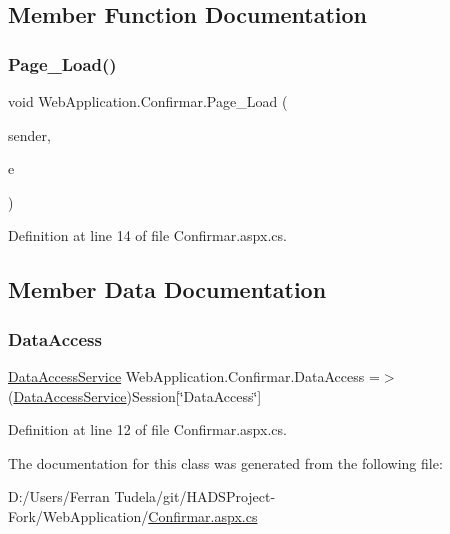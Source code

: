 \subsection{Member Function Documentation}
\mbox{\label{classWebApplication_1_1Confirmar_a0ba1fd0d9bb4844635cf79b6762cb42b}} 
\subsubsection{\texorpdfstring{Page\_Load()}{Page\_Load()}}
{\footnotesize\ttfamily void Web\+Application.\+Confirmar.\+Page\+\_\+\+Load (\begin{DoxyParamCaption}\item[{object}]{sender,  }\item[{Event\+Args}]{e }\end{DoxyParamCaption})\hspace{0.3cm}{\ttfamily [protected]}}



Definition at line 14 of file Confirmar.\+aspx.\+cs.



\subsection{Member Data Documentation}
\mbox{\label{classWebApplication_1_1Confirmar_ac2223a11ebcaa342108a44f9c8277855}} 
\subsubsection{\texorpdfstring{DataAccess}{DataAccess}}
{\footnotesize\ttfamily \mbox{\hyperlink{classDataBaseAccess_1_1DataAccessService}{Data\+Access\+Service}} Web\+Application.\+Confirmar.\+Data\+Access =$>$ (\mbox{\hyperlink{classDataBaseAccess_1_1DataAccessService}{Data\+Access\+Service}})Session\mbox{[}\char`\"{}Data\+Access\char`\"{}\mbox{]}\hspace{0.3cm}{\ttfamily [private]}}



Definition at line 12 of file Confirmar.\+aspx.\+cs.



The documentation for this class was generated from the following file\+:\begin{DoxyCompactItemize}
\item 
D\+:/\+Users/\+Ferran Tudela/git/\+H\+A\+D\+S\+Project-\/\+Fork/\+Web\+Application/\mbox{\hyperlink{Confirmar_8aspx_8cs}{Confirmar.\+aspx.\+cs}}\end{DoxyCompactItemize}
